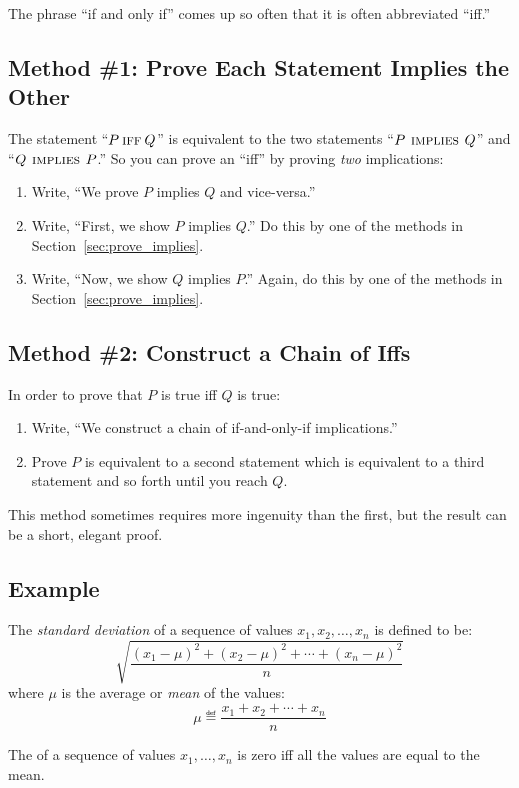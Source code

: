 The phrase ``if and only if'' comes up so often that it is often
abbreviated ``iff.''

\subsection{Method \#1:  Prove Each Statement Implies the Other}

The statement ``$P \mathbin{\mathrm{\textsc{iff}}} Q$'' is equivalent to the two statements ``$P
\mathbin{\mathrm{\textsc{\,implies\,}}} Q$'' and ``$Q \mathbin{\mathrm{\textsc{\,implies\,}}} P$.''  So you can prove an ``iff'' by
proving \textit{two} implications:
%
\begin{enumerate}
\item Write, ``We prove $P$ implies $Q$ and vice-versa.''
\item Write, ``First, we show $P$ implies $Q$.'' Do this by one
of the methods in Section~\ref{sec:prove_implies}.
\item Write, ``Now, we show $Q$ implies $P$.''  Again, do this by
one of the methods in Section~\ref{sec:prove_implies}.
\end{enumerate}

\subsection{Method \#2:  Construct a Chain of Iffs}
In order to prove that $P$ is true iff $Q$ is true:
%
\begin{enumerate}
\item Write, ``We construct a chain of if-and-only-if implications.''
\item Prove $P$ is equivalent to a second statement which is
equivalent to a third statement and so forth until you reach $Q$.
\end{enumerate}
%
This method sometimes requires more ingenuity than the first, but the
result can be a short, elegant proof.

\subsection*{Example}
The \textit{standard deviation} of a sequence of values $x_1, x_2,
\dots, x_n$ is defined to be:
%
\begin{equation}\label{sd}
\sqrt{\frac{(x_1 - \mu)^2 + (x_2 - \mu)^2 + \cdots + (x_n - \mu)^2}{n}}
\end{equation}
%
where $\mu$ is the average or \emph{mean} of the values:
%
\[
\mu \eqdef \frac{x_1 + x_2 + \cdots + x_n}{n}
\]

\begin{theorem}
The  of a sequence of values $x_1, \dots, x_n$ is
zero iff all the values are equal to the mean.
\end{theorem}

